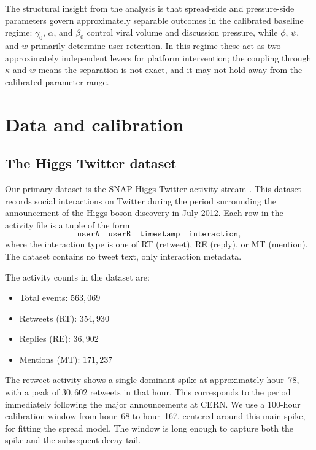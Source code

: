\documentclass[11pt]{article}
\begin{document}
The structural insight from the analysis is that spread-side and pressure-side parameters govern approximately separable outcomes in the calibrated baseline regime: $\gamma_0$, $\alpha$, and $\beta_0$ control viral volume and discussion pressure, while $\phi$, $\psi$, and $w$ primarily determine user retention. In this regime these act as two approximately independent levers for platform intervention; the coupling through $\kappa$ and $w$ means the separation is not exact, and it may not hold away from the calibrated parameter range.

\clearpage
\section{Data and calibration}
\label{sec:data}

\subsection{The Higgs Twitter dataset}

Our primary dataset is the SNAP Higgs Twitter activity stream \cite{snap, domenico2013}. This dataset records social interactions on Twitter during the period surrounding the announcement of the Higgs boson discovery in July 2012. Each row in the activity file is a tuple of the form
\[
\texttt{userA}\quad \texttt{userB}\quad \texttt{timestamp}\quad \texttt{interaction},
\]
where the interaction type is one of RT (retweet), RE (reply), or MT (mention). The dataset contains no tweet text, only interaction metadata.

The activity counts in the dataset are:
\begin{itemize}[leftmargin=1.5em]
    \item Total events: $563{,}069$
    \item Retweets (RT): $354{,}930$
    \item Replies (RE): $36{,}902$
    \item Mentions (MT): $171{,}237$
\end{itemize}

The retweet activity shows a single dominant spike at approximately hour~78, with a peak of $30{,}602$ retweets in that hour. This corresponds to the period immediately following the major announcements at CERN. We use a 100-hour calibration window from hour~68 to hour~167, centered around this main spike, for fitting the spread model. The window is long enough to capture both the spike and the subsequent decay tail.
\end{document}
